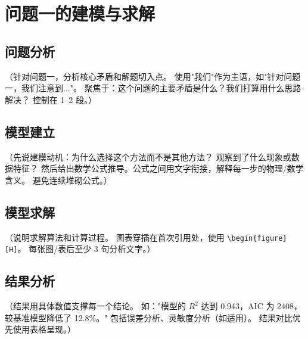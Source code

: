 \section{问题一的建模与求解}

\subsection{问题分析}

（针对问题一，分析核心矛盾和解题切入点。
使用"我们"作为主语，如"针对问题一，我们注意到..."。
聚焦于：这个问题的主要矛盾是什么？我们打算用什么思路解决？
控制在 1--2 段。）

\subsection{模型建立}

（先说建模动机：为什么选择这个方法而不是其他方法？
观察到了什么现象或数据特征？
然后给出数学公式推导。公式之间用文字衔接，解释每一步的物理/数学含义。
避免连续堆砌公式。）

\subsection{模型求解}

（说明求解算法和计算过程。
图表穿插在首次引用处，使用 \verb|\begin{figure}[H]|。
每张图/表后至少 3 句分析文字。）

%

\subsection{结果分析}

（结果用具体数值支撑每一个结论。
如："模型的 $R^2$ 达到 0.943，AIC 为 2408，较基准模型降低了 12.8\%。"
包括误差分析、灵敏度分析（如适用）。
结果对比优先使用表格呈现。）


